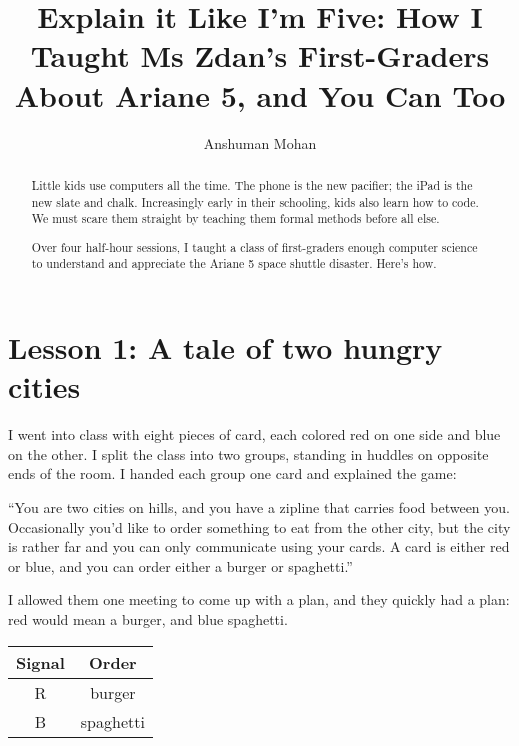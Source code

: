 \documentclass[sigplan,review]{acmart}
\begin{document}
\title[Explain it Like I'm Five]{Explain it Like I'm Five: How I Taught Ms Zdan's First-Graders About Ariane 5, and You Can Too}

\author{Anshuman Mohan}

\begin{abstract}

Little kids use computers all the time.
The phone is the new pacifier; the iPad is the new slate and chalk.
Increasingly early in their schooling, kids also learn how to code.
We must scare them straight by teaching them formal methods before all else.

Over four half-hour sessions, I taught a class of first-graders enough computer science to understand and appreciate the Ariane 5 space shuttle disaster.
Here's how.

\end{abstract}

\maketitle

\section*{Lesson 1: A tale of two hungry cities}

I went into class with eight pieces of card, each colored red on one side and blue on the other.
I split the class into two groups, standing in huddles on opposite ends of the room.
I handed each group one card and explained the game:

``You are two cities on hills, and you have a zipline that carries food between you.
Occasionally you'd like to order something to eat from the other city, but the city is rather far and you can only communicate using your cards.
A card is either red or blue, and you can order either a burger or spaghetti.''

I allowed them one meeting to come up with a plan, and they quickly had a plan: red would mean a burger, and blue spaghetti.

\begin{table}[h]\sffamily
  \begin{tabular}{cc}
  Signal & Order \\
  \midrule
  R & burger \\
  B & spaghetti \\
  \end{tabular}
\end{table}
\end{document}
